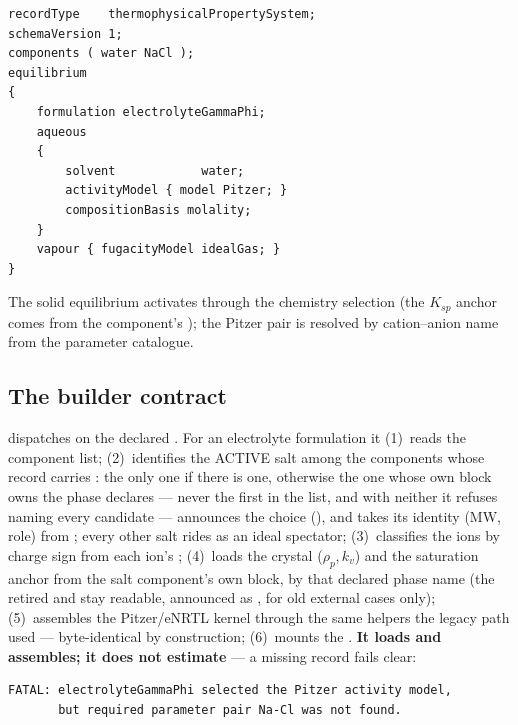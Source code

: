 \documentclass[11pt,a4paper]{article}
\begin{document}
\begin{lstlisting}
recordType    thermophysicalPropertySystem;
schemaVersion 1;
components ( water NaCl );
equilibrium
{
    formulation electrolyteGammaPhi;
    aqueous
    {
        solvent            water;
        activityModel { model Pitzer; }
        compositionBasis molality;
    }
    vapour { fugacityModel idealGas; }
}
\end{lstlisting}

The solid equilibrium activates through the chemistry selection (the
\(K_{sp}\) anchor comes from the component's ); the Pitzer
pair is resolved by cation--anion name from the parameter catalogue.

\subsection{The builder contract}

 dispatches on the declared
.  For an electrolyte formulation it (1)~reads the
component list; (2)~identifies the ACTIVE salt among the components whose
record carries : the only one if there is one, otherwise
the one whose own  block owns the phase
 declares --- never the first in the list, and
with neither it refuses naming every candidate --- announces the choice
(), and takes its identity (MW, role)
from ; every other salt rides as an ideal
spectator; (3)~classifies the ions by charge sign from
each ion's ; (4)~loads the crystal (\(\rho_p, k_v\)) and the saturation anchor from
the salt component's own  block, by that declared
phase name (the retired  and
 stay readable, announced as
\code{[legacy]}, for old external cases only);
(5)~assembles the Pitzer/eNRTL kernel through the same
 helpers the legacy path used --- byte-identical by
construction; (6)~mounts the .  \textbf{It loads and
assembles; it does not estimate} --- a missing record fails clear:

\begin{lstlisting}
FATAL: electrolyteGammaPhi selected the Pitzer activity model,
       but required parameter pair Na-Cl was not found.
\end{lstlisting}
\end{document}
